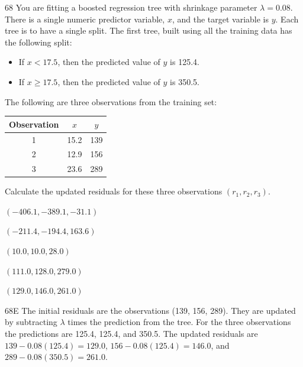 \begin{question}{68}
You are fitting a boosted regression tree with shrinkage parameter $\lambda = 0.08$. There is a single numeric predictor variable, $x$, and the target variable is $y$. Each tree is to have a single split. The first tree, built using all the training data has the following split:
\begin{itemize}
\item If $x < 17.5$, then the predicted value of $y$ is 125.4.
\item If $x \geqslant 17.5$, then the predicted value of $y$ is 350.5.
\end{itemize}
The following are three observations from the training set:
\begin{center}
\begin{tabular}{|c|c|c|}
\hline
Observation & $x$ & $y$ \\ \hline
1 & 15.2 & 139 \\ \hline
2 & 12.9 & 156 \\ \hline
3 & 23.6 & 289 \\ \hline
\end{tabular}
\end{center}

Calculate the updated residuals for these three observations $(r_1, r_2, r_3)$.

\begin{choices}
\item $(-406.1, -389.1, -31.1)$
\item $(-211.4, -194.4, 163.6)$
\item $(10.0, 10.0, 28.0)$
\item $(111.0, 128.0, 279.0)$
\item $(129.0, 146.0, 261.0)$
\end{choices}
\end{question}
\begin{solution}{68}{E}
The initial residuals are the observations (139, 156, 289). They are updated by subtracting $\lambda$ times the prediction from the tree. For the three observations the predictions are 125.4, 125.4, and 350.5. The updated residuals are $139 - 0.08(125.4) = 129.0$, $156 - 0.08(125.4) = 146.0$, and $289 - 0.08(350.5) = 261.0$.
\end{solution}


